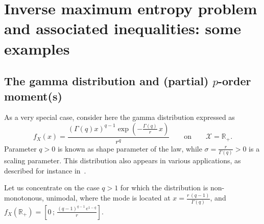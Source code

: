 \documentclass[entropy,article,submit,moreauthors,pdftex]{Definitions/mdpi}
\def\Rset{\mathbb{R}}%
\def\X{\mathcal{X}}%
\begin{document}
\appendixstart
\appendix


\section{Inverse  maximum  entropy  problem  and associated  inequalities:  some
  examples}
\label{secapp:MaxPhiEntExamples}


\subsection{The gamma distribution and (partial) $p$-order moment(s)}
\label{subsecapp:GammaFirstOrder}

As a very special case, consider here the gamma distribution expressed as
%
\begin{equation}
f_X(x) = \frac{\left( \Gamma(q)  x \right)^{q-1} \exp\left(- \frac{\Gamma(q)}{r}
  \, x \right)}{r^q} \qquad \mbox{on} \qquad \X = \Rset_+.
\end{equation}
%
Parameter  $q >  0$ is  known as  shape parameter  of the  law, while  $\sigma =
\frac{r}{\Gamma(q)} > 0$ is a  scaling parameter. This distribution also appears
in various applications, as described for instance in~\cite{JohKot95:v1}.

Let  us  concentrate  on  the  case  $q >  1$  for  which  the  distribution  is
non-monotonous,  unimodal,  where  the  mode  is located  at  $x  =  \frac{r  \,
  (q-1)}{\Gamma(q)}$, and $f_X(\Rset_+) = \left[  0 \, ; \, \frac{(q-1)^{q-1} \,
    e^{1-q}}{r} \right]$.
\end{document}
